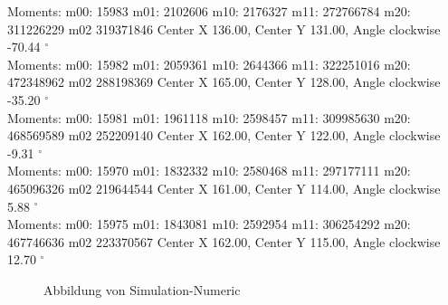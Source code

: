 \documentclass[a4paper]{report}
\begin{document}
\begin{tcolorbox}
Moments: m00: 15983 m01: 2102606 m10: 2176327 m11: 272766784 m20: 311226229 m02 319371846
Center X 136.00, Center Y 131.00, Angle clockwise -70.44 $^\circ$ \\

Moments: m00: 15982 m01: 2059361 m10: 2644366 m11: 322251016 m20: 472348962 m02 288198369
Center X 165.00, Center Y 128.00, Angle clockwise -35.20 $^\circ$ \\

Moments: m00: 15981 m01: 1961118 m10: 2598457 m11: 309985630 m20: 468569589 m02 252209140
Center X 162.00, Center Y 122.00, Angle clockwise -9.31 $^\circ$ \\

Moments: m00: 15970 m01: 1832332 m10: 2580468 m11: 297177111 m20: 465096326 m02 219644544
Center X 161.00, Center Y 114.00, Angle clockwise 5.88 $^\circ$ \\

Moments: m00: 15975 m01: 1843081 m10: 2592954 m11: 306254292 m20: 467746636 m02 223370567
Center X 162.00, Center Y 115.00, Angle clockwise 12.70 $^\circ$ 

\end{tcolorbox}


	\begin{figure}[H]
	\centering
	\caption{Abbildung von Simulation-Numeric}
	\label{fig:Abbildung_von_Simulation_-_Numeric}
	\end{figure}

\end{document}
